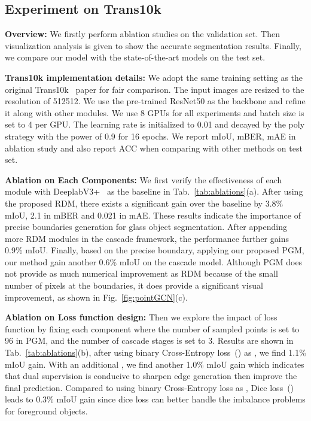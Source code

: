 \subsection{Experiment on Trans10k}

\noindent \textbf{Overview:} We firstly perform ablation studies on the validation set. Then visualization analysis is given to show the accurate segmentation results. Finally, we compare our model with the state-of-the-art models on the test set.

\noindent \textbf{Trans10k implementation details:} \iffalse We implement our method using  Pytorch~\cite{pytorch} \fi We adopt the same training setting as the original Trans10k~\cite{trans10k_xieenze} paper for fair comparison. The input images are resized to the resolution of 512512. We use the pre-trained ResNet50 as the backbone and refine it along with other modules. We use 8 GPUs for all experiments and batch size is set to 4 per GPU. The learning rate is initialized to 0.01 and decayed by the poly strategy with the power of 0.9 for 16 epochs. We report mIoU, mBER, mAE in ablation study and also report ACC when comparing with other methods on test set.

\noindent \textbf{Ablation on Each Components:} We first verify the effectiveness of each module with DeeplabV3+~\cite{deeplabv3p} as the baseline in Tab.~\ref{tab:ablations}(a). After using the proposed RDM, there exists a significant gain over the baseline by 3.8\% mIoU, 2.1 in mBER and 0.021 in mAE. These results indicate the importance of precise boundaries generation for glass object segmentation. After appending more RDM modules in the cascade framework, the performance further gains 0.9\% mIoU. Finally, based on the precise boundary, applying our proposed PGM, our method gain another 0.6\% mIoU on the cascade model. Although PGM does not provide as much numerical improvement as RDM because of the small number of pixels at the boundaries, it does provide a significant visual improvement, as shown in Fig.~\ref{fig:pointGCN}(c). 

\noindent \textbf{Ablation on Loss function design:} Then we explore the impact of loss function by fixing each component where the number of sampled points is set to 96 in PGM, and the number of cascade stages is set to 3. Results are shown in Tab.~\ref{tab:ablations}(b), after using binary Cross-Entropy loss~() as , we find 1.1\% mIoU gain. With an additional  , we find another 1.0\% mIoU gain which indicates that dual supervision is conducive to sharpen edge generation then improve the final prediction. Compared to using binary Cross-Entropy loss as , Dice loss~() leads to 0.3\% mIoU gain since dice loss can better handle the imbalance problems for foreground objects. 



